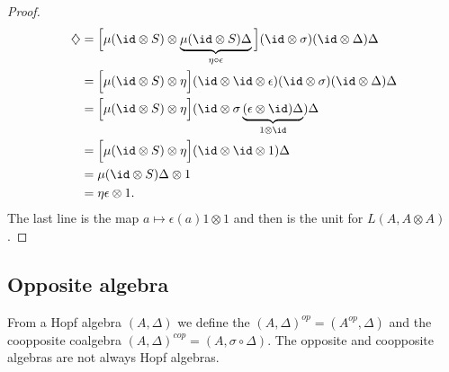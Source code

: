 \begin{proof}
	\begin{subequations}
		\begin{align}
			\diamondsuit & =\Big[ \mu(\id\otimes S)\otimes \underbrace{\mu(\id\otimes S)\Delta}_{\eta\circ\epsilon} \Big](\id\otimes\sigma)(\id\otimes\Delta)\Delta \\
			             & =\Big[ \mu(\id\otimes S)\otimes\eta \Big](\id\otimes\id\otimes\epsilon)(\id\otimes\sigma)(\id\otimes\Delta)\Delta                        \\
			             & =\Big[ \mu(\id\otimes S)\otimes\eta \Big](\id\otimes \sigma\underbrace{(\epsilon\otimes\id)\Delta}_{1\otimes\id} )\Delta                 \\
			             & =\Big[ \mu(\id\otimes S)\otimes\eta \Big](\id\otimes\id\otimes 1)\Delta                                                                  \\
			             & =\mu(\id\otimes S)\Delta\otimes 1                                                                                                        \\
			             & =\eta\epsilon\otimes 1.
		\end{align}
	\end{subequations}
	The last line is the map \( a\mapsto \epsilon(a)1\otimes 1\) and then is the unit for \( L(A,A\otimes A)\).
\end{proof}

\subsection{Opposite algebra}

From a Hopf algebra \( (A,\Delta)\) we define the  \( (A,\Delta)^{op}=(A^{op},\Delta)\) and the coopposite coalgebra \( (A,\Delta)^{cop}=(A,\sigma\circ\Delta)\). The opposite and coopposite algebras are not always Hopf algebras.

